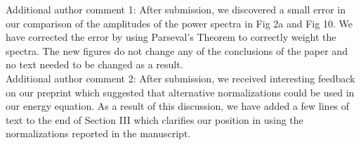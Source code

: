 \documentclass[12pt]{article}
\begin{document}
Additional author comment 1: After submission, we discovered a small error in our comparison of the amplitudes of the power spectra in Fig 2a and Fig 10. 
We have corrected the error by using Parseval's Theorem to correctly weight the spectra. The new figures do not change any of the conclusions of the paper and no text needed to be changed as a result. \\

Additional author comment 2: After submission, we received interesting feedback on our preprint which suggested that alternative normalizations could be used in our energy equation. As a result of this discussion, we have added a few lines of text to the end of Section III which clarifies our position in using the normalizations reported in the manuscript. \\
\end{document}
